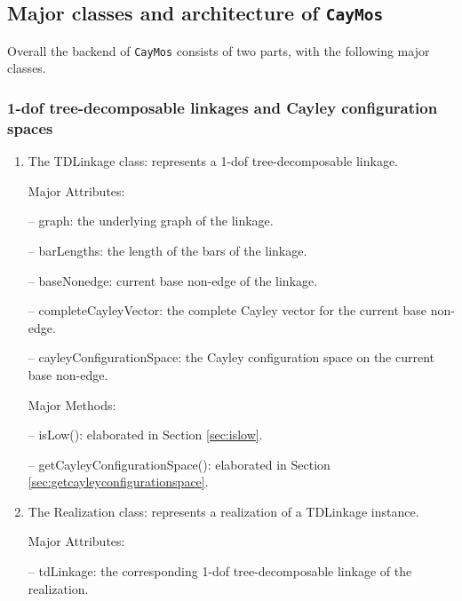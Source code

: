 \documentclass[10pt]{article}
\begin{document}
\subsection{Major classes and architecture of \texttt{CayMos}}
\label{sec:classes}



Overall the backend of \texttt{CayMos} consists of two parts, with the following major classes. 


\subsubsection{1-dof tree-decomposable linkages and Cayley configuration spaces}


\begin{enumerate}


\item The \textsf{TDLinkage} class: represents a 1-dof tree-decomposable linkage. 



 Major Attributes:

\noindent --  \textsf{graph}: the underlying graph of the linkage. 

\noindent --  \textsf{barLengths}: the length of the bars of the linkage. 

\noindent --  \textsf{baseNonedge}: current base non-edge of the linkage.

\noindent --  \textsf{completeCayleyVector}: the complete Cayley vector for the current base non-edge.

\noindent --  \textsf{cayleyConfigurationSpace}: the Cayley configuration space on the current base non-edge. 

\smallskip
\noindent Major Methods:

\noindent-- \textsf{isLow()}: elaborated in Section \ref{sec:islow}.

\noindent-- \textsf{getCayleyConfigurationSpace()}: elaborated in Section \ref{sec:getcayleyconfigurationspace}.


\item The \textsf{Realization} class: represents a realization of a \textsf{TDLinkage} instance.

\noindent Major Attributes:

\noindent --  \textsf{tdLinkage}:
the corresponding 1-dof tree-decomposable linkage of the realization. 


\end{enumerate}
\end{document}
